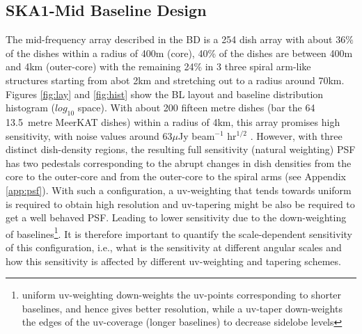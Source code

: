 \documentclass[sfheadings,a4paper,10pt,floats,floatfix]{article}
\begin{document}
\subsection{SKA1-Mid Baseline Design}\label{sec:BL}
The mid-frequency array described in the BD is a 254 dish array with about $36\%$ of the dishes within a radius of 400m (core),
40\% of the dishes are between 400m and 4km (outer-core) with the remaining 24\% in 3 three spiral arm-like structures starting
from abot 2km and stretching out to a radius around 70km. Figures \ref{fig:lay} and \ref{fig:hist} show the BL layout and baseline
distribution histogram ($log_{10}$ space). With about 200 fifteen metre dishes (bar the 64 13.5~metre MeerKAT dishes) within a
radius of 4km, this array promises high sensitivity, with noise values around 63$\mu$Jy beam$^{-1}$ hr$^{1/2}$ \cite{bd}. However,
with three distinct dish-density regions, the resulting full sensitivity (natural weighting) PSF has two pedestals corresponding
to the abrupt changes in dish densities from the core to the outer-core and from the outer-core to the spiral arms (see Appendix
\ref{app:psf}). With such a configuration, a uv-weighting that tends towards uniform is required to obtain high resolution and
uv-tapering might be also be required to get a well behaved PSF. Leading to lower sensitivity due to the down-weighting of
baselines\footnote{uniform uv-weighting down-weights the uv-points corresponding to shorter baselines, and hence gives better
resolution, while a uv-taper down-weights the edges of the uv-coverage (longer baselines) to decrease sidelobe levels}. It is
therefore important to quantify the scale-dependent sensitivity of this configuration, i.e., what is the sensitivity at different
angular scales and how this sensitivity is affected by different uv-weighting and tapering schemes. 
\end{document}
